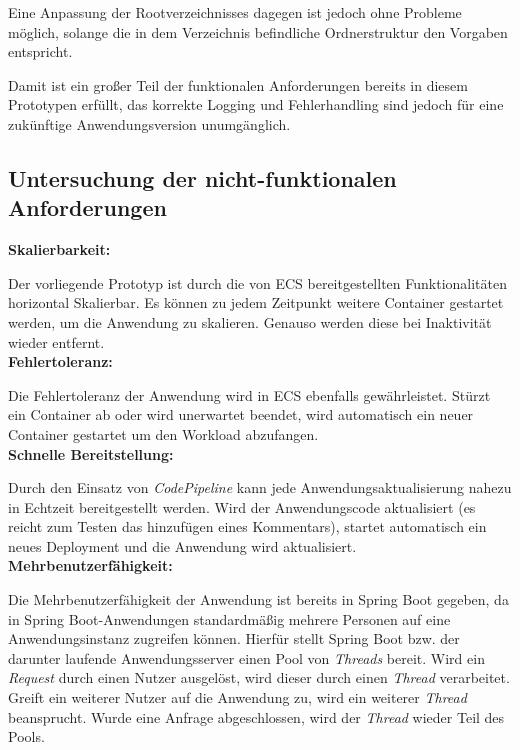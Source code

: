 Eine Anpassung der Rootverzeichnisses dagegen ist jedoch ohne Probleme möglich, solange die in dem Verzeichnis befindliche Ordnerstruktur den Vorgaben entspricht.

Damit ist ein großer Teil der funktionalen Anforderungen bereits in diesem Prototypen erfüllt, das korrekte Logging und Fehlerhandling sind jedoch für eine zukünftige Anwendungsversion unumgänglich.

\subsection{Untersuchung der nicht-funktionalen Anforderungen}
\textbf{Skalierbarkeit:}

Der vorliegende Prototyp ist durch die von \ac{ECS} bereitgestellten Funktionalitäten horizontal Skalierbar. Es können zu jedem Zeitpunkt weitere Container gestartet werden, um die Anwendung zu skalieren. Genauso werden diese bei Inaktivität wieder entfernt. \\

\textbf{Fehlertoleranz:}

Die Fehlertoleranz der Anwendung wird in \ac{ECS} ebenfalls gewährleistet. Stürzt ein Container ab oder wird unerwartet beendet, wird automatisch ein neuer Container gestartet um den Workload abzufangen. \\

\textbf{Schnelle Bereitstellung:}

Durch den Einsatz von \textit{CodePipeline} kann jede Anwendungsaktualisierung nahezu in Echtzeit bereitgestellt werden. Wird der Anwendungscode aktualisiert (es reicht zum Testen das hinzufügen eines Kommentars), startet automatisch ein neues Deployment und die Anwendung wird aktualisiert. \\

\textbf{Mehrbenutzerfähigkeit:}

Die Mehrbenutzerfähigkeit der Anwendung ist bereits in \gls{Spring Boot} gegeben, da in \gls{Spring Boot}-Anwendungen standardmäßig mehrere Personen auf eine Anwendungsinstanz zugreifen können. Hierfür stellt \gls{Spring Boot} bzw. der darunter laufende Anwendungsserver einen Pool von \textit{Threads} bereit. Wird ein \textit{Request} durch einen Nutzer ausgelöst, wird dieser durch einen \textit{Thread} verarbeitet. Greift ein weiterer Nutzer auf die Anwendung zu, wird ein weiterer \textit{Thread} beansprucht. Wurde eine Anfrage abgeschlossen, wird der \textit{Thread} wieder Teil des Pools. \pagebreak

